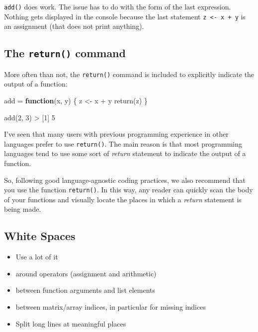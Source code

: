 \documentclass[
]{book}
\newenvironment{Shaded}{\begin{snugshade}}{\end{snugshade}}
\newcommand{\ControlFlowTok}[1]{\textcolor[rgb]{0.13,0.29,0.53}{\textbf{#1}}}
\newcommand{\DecValTok}[1]{\textcolor[rgb]{0.00,0.00,0.81}{#1}}
\newcommand{\FunctionTok}[1]{\textcolor[rgb]{0.00,0.00,0.00}{#1}}
\newcommand{\NormalTok}[1]{#1}
\newcommand{\OtherTok}[1]{\textcolor[rgb]{0.56,0.35,0.01}{#1}}
\newcommand{\SpecialCharTok}[1]{\textcolor[rgb]{0.00,0.00,0.00}{#1}}
\providecommand{\tightlist}{%
  \setlength{\itemsep}{0pt}\setlength{\parskip}{0pt}}
\begin{document}
\texttt{add()} does work. The issue has to do with the form of the last expression.
Nothing gets displayed in the console because the last statement \texttt{z\ \textless{}-\ x\ +\ y}
is an assignment (that does not print anything).

\hypertarget{the-return-command}{%
\subsection{\texorpdfstring{The \texttt{return()} command}{The return() command}}\label{the-return-command}}

More often than not, the \texttt{return()} command is included to explicitly indicate
the output of a function:

\begin{Shaded}
\begin{Highlighting}[]
\NormalTok{add }\OtherTok{=} \ControlFlowTok{function}\NormalTok{(x, y) \{}
\NormalTok{  z }\OtherTok{\textless{}{-}}\NormalTok{ x }\SpecialCharTok{+}\NormalTok{ y}
  \FunctionTok{return}\NormalTok{(z)}
\NormalTok{\}}

\FunctionTok{add}\NormalTok{(}\DecValTok{2}\NormalTok{, }\DecValTok{3}\NormalTok{)}
\SpecialCharTok{\textgreater{}}\NormalTok{ [}\DecValTok{1}\NormalTok{] }\DecValTok{5}
\end{Highlighting}
\end{Shaded}

I've seen that many users with previous programming experience in other languages
prefer to use \texttt{return()}. The main reason is that most programming languages
tend to use some sort of \emph{return} statement to indicate the output of a function.

So, following good language-agnostic coding practices, we also recommend that
you use the function \texttt{return()}. In this way, any reader can quickly scan the
body of your functions and visually locate the places in which a \emph{return}
statement is being made.

\hypertarget{white-spaces}{%
\subsection{White Spaces}\label{white-spaces}}

\begin{itemize}
\tightlist
\item
  Use a lot of it
\item
  around operators (assignment and arithmetic)
\item
  between function arguments and list elements
\item
  between matrix/array indices, in particular for missing indices
\item
  Split long lines at meaningful places
\end{itemize}
\end{document}
